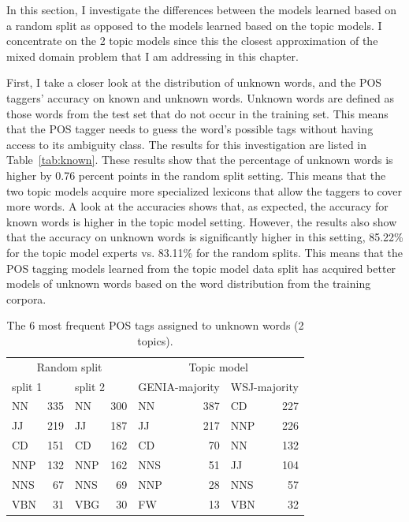 In this section, I investigate the differences between the models learned based on a random split as opposed to the models learned based on the topic models. I concentrate on the 2 topic models since this the closest approximation of the mixed domain problem that I am addressing in this chapter.

First, I take a closer look at the distribution of unknown words, and the POS taggers' accuracy on known and unknown words.  Unknown words are defined as those words from the test set that do not occur in the training set. This means that the POS tagger needs to guess the word's possible tags without having access to its ambiguity class. The results for this investigation are listed in Table~\ref{tab:known}. These results show that the percentage of unknown words is higher by 0.76 percent points in the random split setting. This means that the two topic models acquire more specialized lexicons that allow the taggers to cover more words. A look at the accuracies shows that, as expected, the accuracy for known words is higher in the topic model setting. However, the results also show that the accuracy on unknown words is significantly higher in this setting, 85.22\%  for the topic model experts vs. 83.11\% for the random splits. This means that the POS tagging models learned from the topic model data split has acquired better models of unknown words based on the word distribution from the training corpora.

\begin{table}[t]
\begin{small}
	\begin{center}
		\begin{tabular}{lrlr|lrlr}
			\multicolumn{4}{c}{Random split} &  \multicolumn{4}{|c}{Topic model}\\
			\multicolumn{2}{l}{split 1} & \multicolumn{2}{l}{split 2} & \multicolumn{2}{|l}{GENIA-majority} & \multicolumn{2}{l}{WSJ-majority} \\
			\hline
			NN	& 335	&	NN	& 300		   & NN	  & 387 	& CD	&  227							\\
			JJ	& 219   &	JJ	& 187		   & JJ	  & 217 	& NNP	&  226							\\
			CD	& 151   &	CD	& 162		   & CD	  & 70		& NN	&  132 							\\
			NNP	& 132   &	NNP	& 162		   & NNS  & 51		& JJ	&  104 							\\
			NNS	& 67    &	NNS	& 69		   & NNP  & 28		& NNS	&  57 							\\
			VBN	& 31    &	VBG	& 30		   & FW	  & 13		& VBN	&  32 							\\
			\hline
		\end{tabular}
	\end{center}
	\end{small}
	\caption{The 6 most frequent POS tags assigned to unknown words (2 topics).\label{tab:res:unkpos}}
\end{table}


